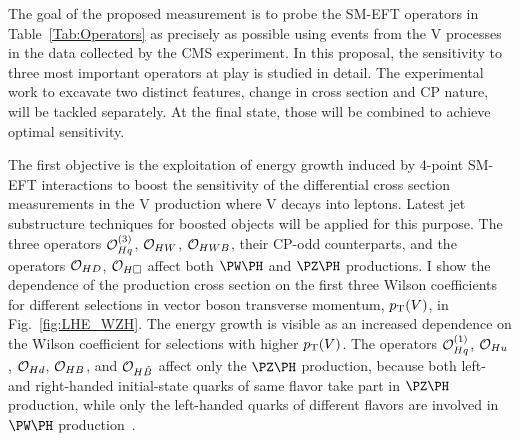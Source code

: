 \documentclass[a4paper,11pt]{article}
\renewcommand{\PV}{{{{V}}}\xspace}
\newcommand{\VH}{{{\PV}{\PH}}\xspace}
\begin{document}
The goal of the proposed measurement is to probe the SM-EFT operators in Table~\ref{Tab:Operators}  as precisely as possible using events from the \VH processes in the data collected by the CMS experiment. 
In this proposal, the sensitivity to three most important operators at play is studied in detail. 
The experimental work to excavate two distinct features, change in cross section and CP nature, will be tackled separately.
At the final state, those will be combined to achieve optimal sensitivity.

The first objective is the exploitation of energy growth
induced by 4-point SM-EFT interactions to boost the sensitivity of the differential cross section measurements in the \VH production where \PV decays into leptons.
Latest jet substructure techniques for boosted objects will be applied for this purpose.
The three operators ${\cal O}^{(3)}_{Hq}$, ${\cal O}_{HW}$, ${\cal O}_{HWB}$, their CP-odd counterparts, and the operators ${\cal O}_{HD}$, ${\cal O}_{H\square}$ affect both $\PW\PH$ and $\PZ\PH$ productions. 
I show the dependence of the production cross section on the first three Wilson coefficients for different selections in vector boson transverse momentum, $\pt(\PV)$, in Fig.~\ref{fig:LHE_WZH}. 
The energy growth is visible as an increased dependence on the Wilson coefficient for selections with higher $\pt(\PV)$. %
The operators ${\cal O}^{(1)}_{Hq}$, ${\cal O}_{Hu}$, ${\cal O}_{Hd}$, ${\cal O}_{HB}$, and ${\cal O}_{H\tilde{B}}$ affect only the $\PZ\PH$ production, 
because both left- and right-handed initial-state quarks of same flavor take part in $\PZ\PH$ production, while only the left-handed quarks of different flavors are involved in $\PW\PH$ production~\cite{Falkowski:2014tna,Banerjee:2018bio}. 
\end{document}

